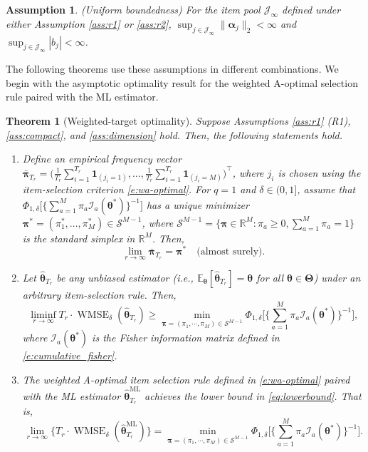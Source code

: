 \documentclass[12pt]{article}
\newcommand{\bfTheta}{\boldsymbol{\Theta}}
\newcommand{\bfalpha}{\boldsymbol{\alpha}}
\newcommand{\bfpi}{\boldsymbol{\pi}}
\newcommand{\bftheta}{\boldsymbol{\theta}}
\newtheorem{theorem}{Theorem}[section]
\newtheorem{assumption}{Assumption}
\begin{document}
\begin{assumption} \label{ass:information3} (Uniform boundedness) For the item pool $\mathcal{J}_{\infty}$ defined under either Assumption \ref{ass:r1} or \ref{ass:r2}, $\sup_{j \in \mathcal{J}_{\infty}} \| \bfalpha_j \|_2 < \infty$ and $\sup_{j \in \mathcal{J}_{\infty}} |b_j| < \infty$. 
\end{assumption}

The following theorems use these assumptions in different combinations. We begin with the asymptotic optimality result for the weighted A-optimal selection rule paired with the ML estimator.


\begin{theorem}[Weighted-target optimality]
\label{thm:optimality}
Suppose Assumptions \ref{ass:r1} (R1), \ref{ass:compact}, and \ref{ass:dimension} hold. Then, the following statements hold.
\begin{enumerate}
\item Define an empirical frequency vector $\bar{\bfpi}_{T_r} = \Big( \frac{1}{T_r} \sum_{i=1}^{T_r} \mathbf{1}_{(j_i = 1)}, \ldots, \frac{1}{T_r} \sum_{i=1}^{T_r} \mathbf{1}_{(j_i = M)} \Big)^{\top}$, where $j_i$ is chosen using the item-selection criterion \eqref{e:wa-optimal}. For $q = 1$ and $\delta \in (0,1]$, assume that $\Phi_{1,\delta}\Big[ \Big\{ \sum_{a=1}^{M} \pi_a \mathcal{I}_a(\bftheta^{\ast}) \Big\}^{-1}  \Big]$ has a unique minimizer $\bfpi^{\ast} = (\pi_1^{\ast}, \ldots, \pi_M^{\ast}) \in \mathcal{S}^{M-1}$, where $\mathcal{S}^{M-1}=\{\bfpi \in \mathbb{R}^M: \pi_a\geq 0, \sum_{a=1}^M \pi_a=1\}$ is the standard simplex in $\mathbb{R}^M$. Then, 
\begin{equation} \label{eq:freqlimit}
\lim_{r \to \infty} \bar{\bfpi}_{T_r} = \bfpi^{\ast} \quad \text{(almost surely).}
\end{equation}
\item Let $\hat{\bftheta}_{T_r}$ be any unbiased estimator (i.e., $\mathbb{E}_{\bftheta} [\hat{\bftheta}_{T_r}] = \bftheta$ for all $\bftheta \in \bfTheta$) under an arbitrary item-selection rule. Then, 
\begin{equation} \label{eq:lowerbound}
\liminf_{r\to\infty} {T_r} \cdot \operatorname{WMSE}_\delta(\hat{\bftheta}_{T_r}) \geq \min_{\bfpi=(\pi_1,\cdots,\pi_M)\in \mathcal{S}^{M-1}} \Phi_{1,\delta} \Big[  \Big\{ \sum_{a=1}^M \pi_a \mathcal{I}_a(\bftheta^{\ast}) \Big\}^{-1} \Big],
\end{equation}
where $\mathcal{I}_a(\bftheta^{\ast})$ is the Fisher information matrix defined in \eqref{e:cumulative_fisher}. 
\item The weighted A-optimal item selection rule defined in \eqref{e:wa-optimal} paired with the ML estimator $\hat{\bftheta}_{T_r}^{\mathrm{ML}}$ achieves the lower bound in \eqref{eq:lowerbound}. That is,
\begin{equation} \label{eq:upperbound}
\lim_{r\to\infty}\{ T_r \cdot \operatorname{WMSE}_\delta(\hat{\bftheta}_{T_r}^{\mathrm{ML}})\} = \min_{\bfpi=(\pi_1,\cdots,\pi_M)\in \mathcal{S}^{M-1}} \Phi_{1,\delta} \Big[  \Big\{ \sum_{a=1}^M \pi_a \mathcal{I}_a(\bftheta^{\ast}) \Big\}^{-1} \Big].
\end{equation}
\end{enumerate}
\end{theorem}
\end{document}
